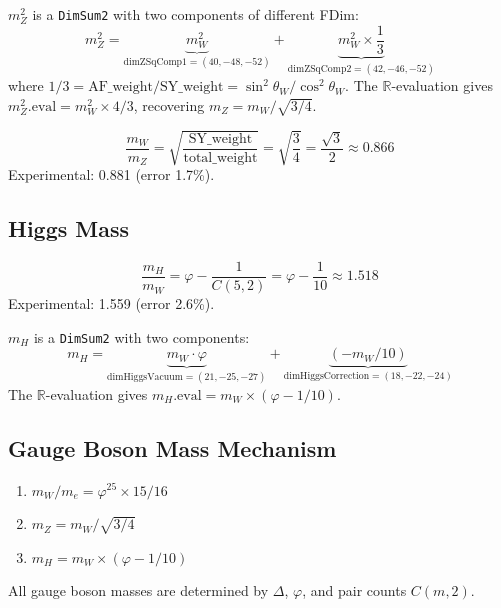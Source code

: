 \begin{theorem}
\label{thm:mass_z}
\leanok
$m_Z^2$ is a \texttt{DimSum2} with two components of different FDim:
\[
m_Z^2 = \underbrace{m_W^2}_{\mathrm{dimZSqComp1} = (40,-48,-52)}
+ \underbrace{m_W^2 \times \frac{1}{3}}_{\mathrm{dimZSqComp2} = (42,-46,-52)}
\]
where $1/3 = \mathrm{AF\_weight}/\mathrm{SY\_weight} = \sin^2\theta_W / \cos^2\theta_W$.
The $\mathbb{R}$-evaluation gives $m_Z^2.\mathrm{eval} = m_W^2 \times 4/3$, recovering $m_Z = m_W / \sqrt{3/4}$.
\end{theorem}

\begin{theorem}[W/Z Ratio]
\label{thm:mass_w_z}
\leanok
\[
\frac{m_W}{m_Z} = \sqrt{\frac{\mathrm{SY\_weight}}{\mathrm{total\_weight}}} = \sqrt{\frac{3}{4}} = \frac{\sqrt{3}}{2} \approx 0.866
\]
Experimental: 0.881 (error 1.7\%).
\end{theorem}

\subsection{Higgs Mass}

\begin{theorem}
\label{thm:mass_higgs_w}
\leanok
\[
\frac{m_H}{m_W} = \varphi - \frac{1}{C(5,2)} = \varphi - \frac{1}{10} \approx 1.518
\]
Experimental: 1.559 (error 2.6\%).
\end{theorem}

\begin{theorem}
\label{thm:mass_higgs_dimensioned}
\leanok
$m_H$ is a \texttt{DimSum2} with two components:
\[
m_H = \underbrace{m_W \cdot \varphi}_{\mathrm{dimHiggsVacuum} = (21,-25,-27)}
+ \underbrace{(-m_W / 10)}_{\mathrm{dimHiggsCorrection} = (18,-22,-24)}
\]
The $\mathbb{R}$-evaluation gives $m_H.\mathrm{eval} = m_W \times (\varphi - 1/10)$.
\end{theorem}

\subsection{Gauge Boson Mass Mechanism}

\begin{theorem}
\label{thm:gauge_boson_chain}
\leanok
\begin{enumerate}
\item $m_W / m_e = \varphi^{25} \times 15/16$
\item $m_Z = m_W / \sqrt{3/4}$
\item $m_H = m_W \times (\varphi - 1/10)$
\end{enumerate}
All gauge boson masses are determined by $\Delta$, $\varphi$, and pair counts $C(m,2)$.
\end{theorem}

